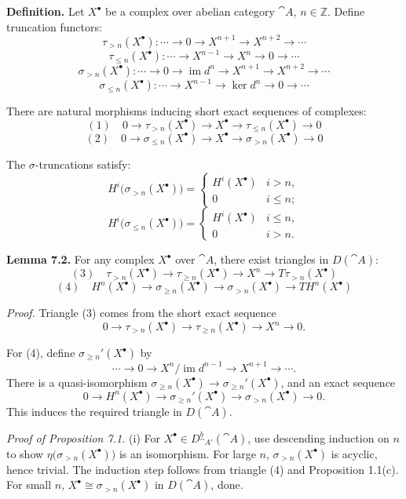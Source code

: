 \textbf{Definition.}
Let \(X^\bullet\) be a complex over abelian category \(\cat{A}\), \(n\in\mathbb{Z}\).
Define truncation functors:
\[
\tau_{>n}(X^\bullet)\colon \cdots\to 0\to X^{n+1}\to X^{n+2}\to\cdots
\]
\[
\tau_{\le n}(X^\bullet)\colon \cdots\to X^{n-1}\to X^n\to 0\to\cdots
\]
\[
\sigma_{>n}(X^\bullet)\colon \cdots\to 0\to \operatorname{im}d^n\to X^{n+1}\to X^{n+2}\to\cdots
\]
\[
\sigma_{\le n}(X^\bullet)\colon \cdots\to X^{n-1}\to \ker d^n\to 0\to\cdots
\]

\setcounter{page}{70}
There are natural morphisms inducing short exact sequences of complexes:
\[
(1)\quad 0 \to \tau_{>n}(X^\bullet) \to X^\bullet \to \tau_{\le n}(X^\bullet) \to 0
\]
\[
(2)\quad 0 \to \sigma_{\le n}(X^\bullet) \to X^\bullet \to \sigma_{>n}(X^\bullet) \to 0
\]

The \(\sigma\)-truncations satisfy:
\[
H^i\big(\sigma_{>n}(X^\bullet)\big)
=
\begin{cases}
H^i(X^\bullet) & i>n,\\
0 & i\le n;
\end{cases}
\]
\[
H^i\big(\sigma_{\le n}(X^\bullet)\big)
=
\begin{cases}
H^i(X^\bullet) & i\le n,\\
0 & i>n.
\end{cases}
\]

\setcounter{page}{71}
\textbf{Lemma 7.2.}
For any complex \(X^\bullet\) over \(\cat{A}\), there exist triangles in \(D(\cat{A})\):
\[
(3)\quad \tau_{>n}(X^\bullet) \to \tau_{\ge n}(X^\bullet) \to X^n \to T\tau_{>n}(X^\bullet)
\]
\[
(4)\quad H^n(X^\bullet) \to \sigma_{\ge n}(X^\bullet) \to \sigma_{>n}(X^\bullet) \to T H^n(X^\bullet)
\]

\textit{Proof.}
Triangle (3) comes from the short exact sequence
\[
0\to\tau_{>n}(X^\bullet)\to\tau_{\ge n}(X^\bullet)\to X^n\to 0.
\]

For (4), define
\(\sigma_{\ge n}'(X^\bullet)\) by
\[
\cdots\to 0\to X^n/\operatorname{im}d^{n-1}\to X^{n+1}\to\cdots.
\]
There is a quasi-isomorphism \(\sigma_{\ge n}(X^\bullet)\to\sigma_{\ge n}'(X^\bullet)\),
and an exact sequence
\[
0\to H^n(X^\bullet)\to\sigma_{\ge n}'(X^\bullet)\to\sigma_{>n}(X^\bullet)\to 0.
\]
This induces the required triangle in \(D(\cat{A})\).

\setcounter{page}{72}
\textit{Proof of Proposition 7.1.}
(i) For \(X^\bullet\in D_{\cat{A}'}^b(\cat{A})\),
use descending induction on \(n\) to show
\(\eta\big(\sigma_{>n}(X^\bullet)\big)\) is an isomorphism.
For large \(n\), \(\sigma_{>n}(X^\bullet)\) is acyclic, hence trivial.
The induction step follows from triangle (4) and Proposition 1.1(c).
For small \(n\), \(X^\bullet\cong\sigma_{>n}(X^\bullet)\) in \(D(\cat{A})\), done.


